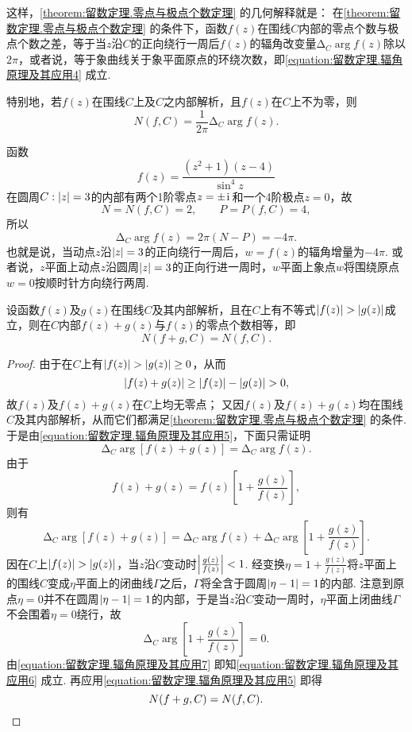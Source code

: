 这样，\cref{theorem:留数定理.零点与极点个数定理} 的几何解释就是：
在\cref{theorem:留数定理.零点与极点个数定理} 的条件下，函数\(f(z)\)在围线\(C\)内部的零点个数与极点个数之差，等于当\(z\)沿\(C\)的正向绕行一周后\(f(z)\)的辐角改变量\(\increment_C \arg f(z)\)除以\(2\pi\)，或者说，等于象曲线关于象平面原点的环绕次数，即\cref{equation:留数定理.辐角原理及其应用4} 成立.

特别地，若\(f(z)\)在围线\(C\)上及\(C\)之内部解析，且\(f(z)\)在\(C\)上不为零，则\begin{equation}\label{equation:留数定理.辐角原理及其应用5}
N(f,C) = \frac{1}{2\pi} \increment_C \arg f(z).
\end{equation}

\begin{example}
函数\[
f(z) = \frac{(z^2+1)(z-4)}{\sin^4 z}
\]在圆周\(C: \abs{z}=3\)的内部有两个1阶零点\(z=\pm\kern1pt\mathrm{i}\kern1pt\)和一个4阶极点\(z=0\)，故\[
N=N(f,C)=2, \qquad P=P(f,C)=4,
\]所以\[
\increment_C \arg f(z) = 2\pi(N - P) = -4\pi.
\]也就是说，当动点\(z\)沿\(\abs{z}=3\)的正向绕行一周后，\(w = f(z)\)的辐角增量为\(-4\pi\).
或者说，\(z\)平面上动点\(z\)沿圆周\(\abs{z}=3\)的正向行进一周时，\(w\)平面上象点\(w\)将围绕原点\(w=0\)按顺时针方向绕行两周.
\end{example}

\begin{theorem}[儒歇定理]
设函数\(f(z)\)及\(g(z)\)在围线\(C\)及其内部解析，且在\(C\)上有不等式\(\abs{f(z)}>\abs{g(z)}\)成立，则在\(C\)内部\(f(z)+g(z)\)与\(f(z)\)的零点个数相等，即\[
N(f+g,C) = N(f,C).
\]
\begin{proof}
由于在\(C\)上有\(\abs{f(z)}>\abs{g(z)}\geq0\)，从而\[
\abs{f(z)+g(z)}\geq\abs{f(z)}-\abs{g(z)}>0,
\]故\(f(z)\)及\(f(z)+g(z)\)在\(C\)上均无零点；
又因\(f(z)\)及\(f(z)+g(z)\)均在围线\(C\)及其内部解析，从而它们都满足\cref{theorem:留数定理.零点与极点个数定理} 的条件.
于是由\cref{equation:留数定理.辐角原理及其应用5}，下面只需证明\begin{equation}\label{equation:留数定理.辐角原理及其应用6}
\increment_C \arg[f(z)+g(z)] = \increment_C \arg f(z).
\end{equation}
由于\[
f(z)+g(z) = f(z) \left[1+\frac{g(z)}{f(z)}\right],
\]则有\begin{equation}\label{equation:留数定理.辐角原理及其应用7}
\increment_C \arg[f(z)+g(z)] = \increment_C \arg f(z) + \increment_C \arg\left[1+\frac{g(z)}{f(z)}\right].
\end{equation}
因在\(C\)上\(\abs{f(z)}>\abs{g(z)}\)，当\(z\)沿\(C\)变动时\(\abs{\frac{g(z)}{f(z)}}<1\).
经变换\(\eta=1+\frac{g(z)}{f(z)}\)将\(z\)平面上的围线\(C\)变成\(\eta\)平面上的闭曲线\(\Gamma\)之后，\(\Gamma\)将全含于圆周\(\abs{\eta-1}=1\)的内部.
注意到原点\(\eta=0\)并不在圆周\(\abs{\eta-1}=1\)的内部，于是当\(z\)沿\(C\)变动一周时，\(\eta\)平面上闭曲线\(\Gamma\)不会围着\(\eta=0\)绕行，故\[
\increment_C \arg\left[1+\frac{g(z)}{f(z)}\right] = 0.
\]
由\cref{equation:留数定理.辐角原理及其应用7} 即知\cref{equation:留数定理.辐角原理及其应用6} 成立.
再应用\cref{equation:留数定理.辐角原理及其应用5} 即得\[
N(f+g,C) = N(f,C).
\qedhere
\]
\end{proof}
\end{theorem}

